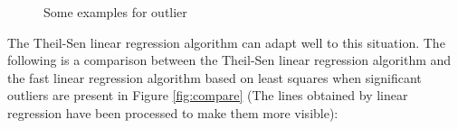 \documentclass[12pt, a4paper, oneside]{report}
\begin{document}
\begin{figure}[H]
  \centering
  \vspace{0.5cm}
  \caption{Some examples for outlier}
  \label{fig:linear regression}
\end{figure}


The Theil-Sen linear regression algorithm can adapt well to this situation. The following is a comparison between the Theil-Sen linear regression algorithm and the fast linear regression algorithm based on least squares when significant outliers are present in Figure \ref{fig:compare} (The lines obtained by linear regression have been processed to make them more visible):
\end{document}
